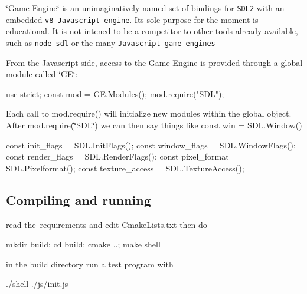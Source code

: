 \char`\"{}\+Game Engine\char`\"{} is an unimaginatively named set of bindings for \href{https://www.libsdl.org/}{\tt S\+D\+L2} with an embedded \href{https://v8.dev/docs}{\tt v8 Javascript engine}. Its sole purpose for the moment is educational. It is not intened to be a competitor to other tools already available, such as \href{https://www.npmjs.com/package/sdl}{\tt node-\/sdl} or the many \href{https://github.com/collections/javascript-game-engines}{\tt Javascript game engines}

From the Javascript side, access to the Game Engine is provided through a global module called \char`\"{}\+G\+E\char`\"{}\+:


\begin{DoxyCode}
use strict;
const mod = GE.Modules();
mod.require("SDL");
\end{DoxyCode}


Each call to mod.\+require() will initialize new modules within the global object. After {\ttfamily mod.\+require(\char`\"{}\+S\+D\+L\char`\"{})} we can then say things like {\ttfamily const win = S\+D\+L.\+Window()}


\begin{DoxyCode}
const init\_flags = SDL.InitFlags();
const window\_flags = SDL.WindowFlags();
const render\_flags = SDL.RenderFlags();
const pixel\_format = SDL.Pixelformat();
const texture\_access = SDL.TextureAccess();
\end{DoxyCode}


\subsection*{Compiling and running}


\begin{DoxyItemize}
\item read \mbox{\hyperlink{md_requirements}{the requirements}} and edit {\ttfamily Cmake\+Lists.\+txt} then do 
\begin{DoxyCode}
mkdir build; cd build; cmake ..; make shell
\end{DoxyCode}

\item in the build directory run a test program with 
\begin{DoxyCode}
./shell ./js/init.js
\end{DoxyCode}
 
\end{DoxyItemize}